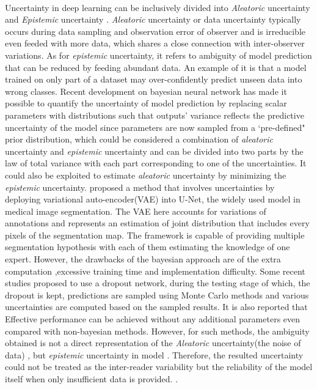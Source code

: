 \documentclass[12pt]{extarticle}
\begin{document}
\paragraph{}
Uncertainty in deep learning can be inclusively divided into \textit{Aleatoric}
uncertainty and \textit{Epistemic} uncertainty \cite{kendall2017uncertainties}.
\textit{Aleatoric} uncertainty or data uncertainty typically occurs during data sampling and
observation error of observer and is irreducible even feeded with more data, which shares a
close connection with inter-observer variations. As for \textit{epistemic}
uncertainty, it refers to ambiguity of model prediction that can be reduced by feeding abundant data.
An example of it is that a model trained on only part of a dataset may over-confidently
predict unseen data into wrong classes. Recent development on 
bayesian neural network has made it possible to quantify the 
uncertainty of model prediction by replacing scalar parameters with distributions such 
that outputs' variance reflects the predictive uncertainty of the model since parameters are now sampled 
from a `pre-defined" prior distribution, which could be considered a 
combination of \textit{aleatoric} uncertainty and \textit{epistemic} uncertainty 
and can be divided into two parts by the law of total variance with each part corresponding to 
one of the uncertainties. It could also be exploited to estimate \textit{aleatoric} uncertainty by 
minimizing the \textit{epistemic} uncertainty. \cite{kohl2019probabilistic} 
proposed a method that involves uncertainties by deploying variational 
auto-encoder(VAE) into U-Net, the widely used model in medical image segmentation\cite{ronneberger2015unet}. 
The VAE here accounts for variations of annotations and represents an 
estimation of joint distribution that includes every pixels of the segmentation map. 
The framework is capable of providing multiple segmentation 
hypothesis with each of them estimating the knowledge of one expert.
However, the drawbacks of the bayesian approach are of the extra computation
,excessive training time and implementation difficulty. 
Some recent studies proposed to use a dropout network, during the testing stage of which, 
the dropout is kept, predictions are sampled using Monte Carlo methods 
and various uncertainties are computed based on the sampled results.
It is also reported that Effective performance can be achieved 
without any additional parameters even compared with non-bayesian methods. 
However, for such methods, the ambiguity obtained is
not a direct representation of the \textit{Aleatoric} uncertainty(the noise of data)
, but \textit{epistemic} uncertainty in model
\cite{kendall2017uncertainties}. Therefore, the resulted uncertainty could not
be treated as the inter-reader variability but the reliability of 
the model itself when only insufficient data is provided. 
\cite{nair_precup_arnold_arbel_2020}. 
\end{document}
